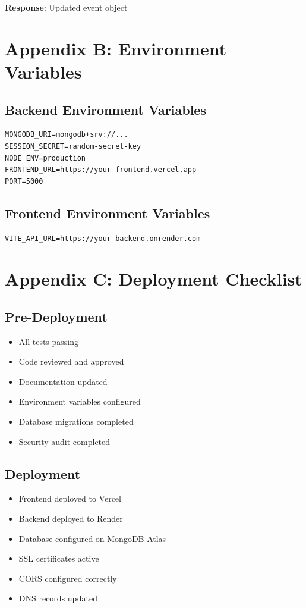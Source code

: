 \documentclass{scrreprt}
\begin{document}
\textbf{Response}: Updated event object

\section{Appendix B: Environment Variables}

\subsection{Backend Environment Variables}
\begin{lstlisting}
MONGODB_URI=mongodb+srv://...
SESSION_SECRET=random-secret-key
NODE_ENV=production
FRONTEND_URL=https://your-frontend.vercel.app
PORT=5000
\end{lstlisting}

\subsection{Frontend Environment Variables}
\begin{lstlisting}
VITE_API_URL=https://your-backend.onrender.com
\end{lstlisting}

\section{Appendix C: Deployment Checklist}

\subsection{Pre-Deployment}
\begin{itemize}
\item[$\square$] All tests passing
\item[$\square$] Code reviewed and approved
\item[$\square$] Documentation updated
\item[$\square$] Environment variables configured
\item[$\square$] Database migrations completed
\item[$\square$] Security audit completed
\end{itemize}

\subsection{Deployment}
\begin{itemize}
\item[$\square$] Frontend deployed to Vercel
\item[$\square$] Backend deployed to Render
\item[$\square$] Database configured on MongoDB Atlas
\item[$\square$] SSL certificates active
\item[$\square$] CORS configured correctly
\item[$\square$] DNS records updated
\end{itemize}
\end{document}
